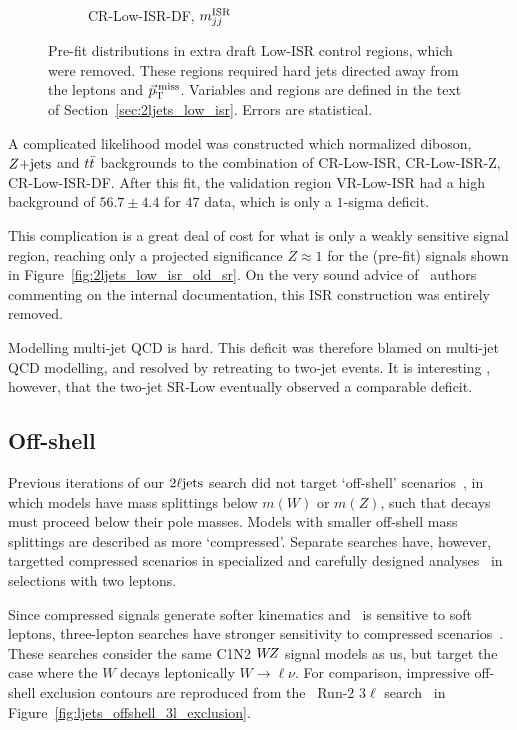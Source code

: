 \begin{figure}[tp]
\begin{subfigure}{0.48\textwidth}
\caption{CR-Low-ISR-DF, $m_{jj}^\mathrm{ISR}$}
\end{subfigure}
\caption[
Pre-fit distributions in extra draft Low-ISR control regions, which were
removed
]{%
Pre-fit distributions in extra draft Low-ISR control regions, which were
removed.
These regions required hard jets directed away from the leptons and $\vec p_\mathrm{T}^\mathrm{\:miss}$.
Variables and regions are defined in the text of
Section~\ref{sec:2ljets_low_isr}.
Errors are statistical.
}
\label{fig:2ljets_low_isr_old_more}
\end{figure}

A complicated likelihood model was constructed which normalized diboson,
$Z\mathrm{+jets}$ and $t\bar t$ backgrounds to the combination of CR-Low-ISR,
CR-Low-ISR-Z, CR-Low-ISR-DF.
After this fit, the validation region VR-Low-ISR had a high background
of $56.7 \pm 4.4$ for $47$ data, which is only a $1$-sigma deficit.

This complication is a great deal of cost for what is only a weakly sensitive
signal region, reaching only a projected significance $Z\approx 1$ for the
(pre-fit) signals shown in Figure~\ref{fig:2ljets_low_isr_old_sr}.
On the very sound advice of \atlas\ authors commenting on the internal
documentation, this ISR construction was entirely removed.

Modelling multi-jet QCD is hard.
This deficit was therefore blamed on multi-jet QCD modelling, and resolved by
retreating to two-jet events.
It is interesting , however, that the two-jet SR-Low eventually observed a
comparable deficit.


\FloatBarrier
\subsection{Off-shell}
\label{sec:2ljets_offshell}
Previous iterations of our $2\ell\mathrm{jets}$ search did not target `off-shell'
scenarios~\cite{atlas_23l_SUSY_2016_24, atlas_2l_SUSY_2013_11}, in which
models have mass splittings below $m(W)$ or $m(Z)$, such that decays must
proceed below their pole masses.
Models with smaller off-shell mass splittings are described as more
`compressed'.
Separate searches have, however, targetted compressed scenarios in
specialized and carefully designed analyses~\cite{
atlas_susy_compressed_2l_2016_partial_run2,
atlas_susy_compressed_2l_2018_run2
} in selections with two leptons.

Since compressed signals generate softer kinematics and \atlas\ is sensitive
to soft leptons, three-lepton searches have stronger sensitivity to
compressed scenarios~\cite{atlas_rjr_3l_SUSY_2019_09}.
These searches consider the same C1N2 $W\kern-0.4exZ$ signal models as us, but target the
case where the $W$ decays leptonically $W\rightarrow\ell\nu$.
For comparison, impressive off-shell exclusion contours are reproduced
from the \atlas\ Run-2 $3\ell$ search~\cite{atlas_rjr_3l_SUSY_2019_09} in
Figure~\ref{fig:ljets_offshell_3l_exclusion}.

